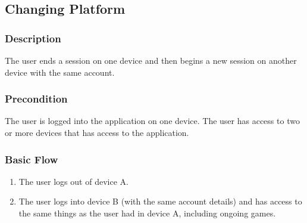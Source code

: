 \subsection{Changing Platform}
\subsubsection{Description}
The user ends a session on one device and then begins a new session on another device with the same account.

\subsubsection{Precondition}
The user is logged into the application on one device.
The user has access to two or more devices that has access to the application.

\subsubsection{Basic Flow}
\begin{enumerate}
\item The user logs out of device A.
\item The user logs into device B (with the same account details) and has access to the same things as the user had in device A, including ongoing games.
\end{enumerate}